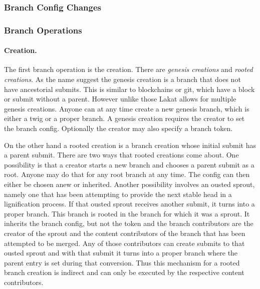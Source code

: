 \documentclass[14pt]{article}
\begin{document}
\subsubsection{Branch Config Changes}
\label{ssc:configchange}


\subsubsection{Branch Operations}
\label{ssc:branchops}


\paragraph{Creation.} The first branch operation is the creation. There are \textit{genesis creations} and \textit{rooted creations}. As the name suggest the genesis creation is a branch that does not have ancestorial submits. This is similar to blockchains or git, which have a block or submit without a parent. However unlike those Lakat allows for multiple genesis creations. Anyone can at any time create a new genesis branch, which is either a twig or a proper branch. A genesis creation requires the creator to set the branch config. Optionally the creator may also specify a branch token.

On the other hand a rooted creation is a branch creation whose initial submit has a parent submit. There are two ways that rooted creations come about. One possibility is that a creator starts a new branch and chooses a parent submit as a root. Anyone may do that for any root branch at any time. The config can then either be chosen anew or inherited. Another possibility involves an ousted sprout, namely one that has been attempting to provide the next stable head in a lignification process. If that ousted sprout receives another submit, it turns into a proper branch. This branch is rooted in the branch for which it was a sprout. It inherits the branch config, but not the token and the branch contributors are the creator of the sprout and the content contributors of the branch that has been attempted to be merged. Any of those contributors can create submits to that ousted sprout and with that submit it turns into a proper branch where the parent entry is set during that conversion. Thus this mechanism for a rooted branch creation is indirect and can only be executed by the respective content contributors.
\end{document}

